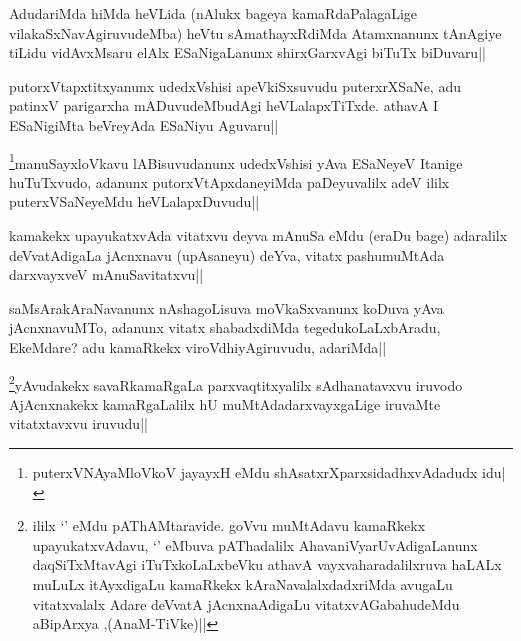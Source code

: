 \begin{artha}
AdudariMda hiMda heVLida (nAlukx bageya kamaRdaPalagaLige vilakaSxNavAgiruvudeMba) heVtu sAmathayxRdiMda Atamxnanunx tAnAgiye tiLidu vidAvxMsaru elAlx ESaNigaLanunx shirxGarxvAgi biTuTx biDuvaru||
\end{artha}


\begin{artha}
putorxVtapxtitxyanunx udedxVshisi apeVkiSxsuvudu puterxrXSaNe, adu patinxV parigarxha mADuvudeMbudAgi heVLalapxTiTxde. athavA I ESaNigiMta beVreyAda ESaNiyu Aguvaru|| 
\end{artha}


\begin{artha}
\footnote{puterxVNAyaMloVkoV jayayxH eMdu shAsatxrXparxsidadhxvAdadudx idu|}manuSayxloVkavu lABisuvudanunx udedxVshisi yAva ESaNeyeV Itanige huTuTxvudo, adanunx putorxVtApxdaneyiMda paDeyuvalilx adeV ililx puterxVSaNeyeMdu heVLalapxDuvudu||
\end{artha}


\begin{artha}
kamakekx upayukatxvAda vitatxvu deyva mAnuSa eMdu (eraDu bage) adaralilx deVvatAdigaLa jAcnxnavu (upAsaneyu) deYva, vitatx pashumuMtAda darxvayxveV mAnuSavitatxvu||
\end{artha}


\begin{artha}
saMsArakAraNavanunx nAshagoLisuva moVkaSxvanunx koDuva yAva jAcnxnavuMTo, adanunx vitatx shabadxdiMda tegedukoLaLxbAradu, EkeMdare? adu kamaRkekx viroVdhiyAgiruvudu, adariMda||
\end{artha}


\begin{artha}
\footnote{ililx `\stext' eMdu pAThAMtaravide. goVvu muMtAdavu kamaRkekx upayukatxvAdavu, `\stext' eMbuva pAThadalilx AhavaniVyarUvAdigaLanunx daqSiTxMtavAgi iTuTxkoLaLxbeVku athavA vayxvaharadalilxruva haLALx muLuLx itAyxdigaLu kamaRkekx kAraNavalalxdadxriMda avugaLu vitatxvalalx Adare deVvatA jAcnxnaAdigaLu vitatxvAGabahudeMdu aBipArxya ,(AnaM-TiVke)||}yAvudakekx savaRkamaRgaLa parxvaqtitxyalilx sAdhanatavxvu iruvodo AjAcnxnakekx kamaRgaLalilx hU muMtAdadarxvayxgaLige iruvaMte vitatxtavxvu iruvudu||
\end{artha}

